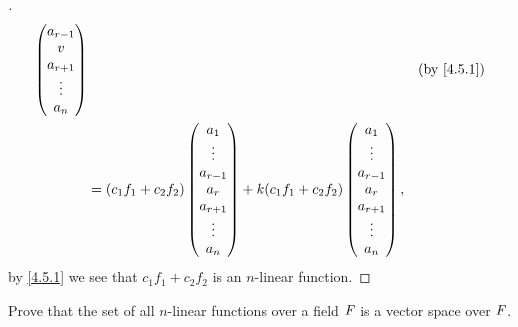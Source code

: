 \begin{proof}[]
\begin{align*}
\begin{pmatrix}
                                                 a_{r - 1} \\
                                                 v         \\
                                                 a_{r + 1} \\
                                                 \vdots    \\
                                                 a_n
                                               \end{pmatrix}             &  & \text{(by \cref{4.5.1})} \\
     & = (c_1 f_1 + c_2 f_2)\begin{pmatrix}
                              a_1       \\
                              \vdots    \\
                              a_{r - 1} \\
                              a_r       \\
                              a_{r + 1} \\
                              \vdots    \\
                              a_n
                            \end{pmatrix} + k (c_1 f_1 + c_2 f_2)\begin{pmatrix}
                                                                   a_1       \\
                                                                   \vdots    \\
                                                                   a_{r - 1} \\
                                                                   a_r       \\
                                                                   a_{r + 1} \\
                                                                   \vdots    \\
                                                                   a_n
                                                                 \end{pmatrix},
  \end{align*}
  by \cref{4.5.1} we see that \(c_1 f_1 + c_2 f_2\) is an \(n\)-linear function.
\end{proof}

\begin{ex}\label{ex:4.5.18}
  Prove that the set of all \(n\)-linear functions over a field \(\mathit{F}\) is a vector space over \(\mathit{F}\).
\end{ex}


